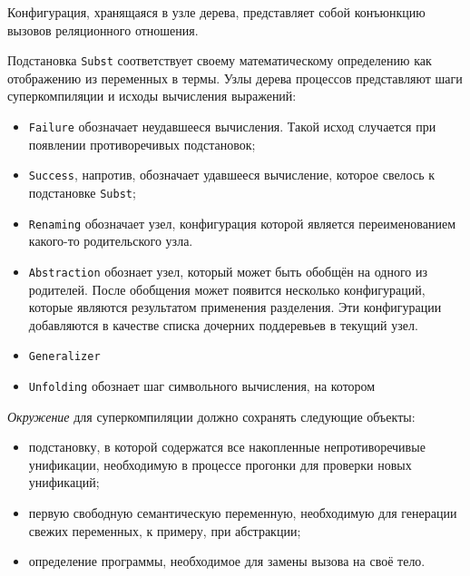 Конфигурация, хранящаяся в узле дерева, представляет собой конъюнкцию вызовов реляционного отношения.

Подстановка \lstinline{Subst} соответствует своему математическому определению как отображению из
переменных в термы.
Узлы дерева процессов представляют шаги суперкомпиляции и исходы вычисления выражений:
\begin{itemize}
\item \lstinline{Failure} обозначает неудавшееся вычисления. Такой исход
      случается при появлении противоречивых подстановок;
\item \lstinline{Success}, напротив, обозначает удавшееся вычисление, которое свелось к подстановке \lstinline{Subst};
\item \lstinline{Renaming} обозначает узел, конфигурация которой является переименованием какого-то родительского узла.
\item \lstinline{Abstraction} обознает узел, который может быть обобщён на одного из родителей.
      После обобщения может появится несколько конфигураций, которые являются результатом применения разделения.
      Эти конфигурации добавляются в качестве списка дочерних поддеревьев в текущий узел. 
\item \lstinline{Generalizer} 
\item \lstinline{Unfolding} обознает шаг символьного вычисления, на котором  
\end{itemize}


\emph{Окружение} для суперкомпиляции должно сохранять следующие объекты:
\begin{itemize}
\item подстановку, в которой содержатся все накопленные непротиворечивые унификации,
      необходимую в процессе прогонки для проверки новых унификаций;
\item первую свободную семантическую переменную, необходимую для генерации свежих переменных,
      к примеру, при абстракции;
\item определение программы, необходимое для замены вызова на своё тело.
\end{itemize}


